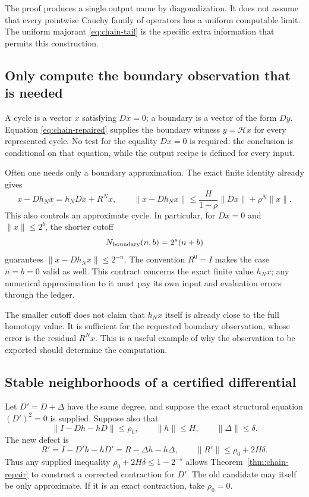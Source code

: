 The proof produces a single output name by diagonalization.  It does not
assume that every pointwise Cauchy family of operators has a uniform
computable limit.  The uniform majorant \eqref{eq:chain-tail} is the
specific extra information that permits this construction.

\subsection{Only compute the boundary observation that is needed}

A cycle is a vector $x$ satisfying $Dx=0$; a boundary is a vector of
the form $Dy$.  Equation \eqref{eq:chain-repaired} supplies the boundary
witness $y=\mathcal Hx$ for every represented cycle.  No test for the
equality $Dx=0$ is required: the conclusion is conditional on that
equation, while the output recipe is defined for every input.

Often one needs only a boundary approximation.  The exact finite identity
already gives
\begin{equation}
 x-Dh_Nx=h_NDx+R^Nx,
 \qquad
 \|x-Dh_Nx\|
 \le\frac{H}{1-\rho}\|Dx\|+\rho^N\|x\|.
 \label{eq:approximate-cycle}
\end{equation}
This also controls an approximate cycle.  In particular, for $Dx=0$ and
$\|x\|\le2^b$, the shorter cutoff
\begin{equation}
                 N_{\rm boundary}(n,b)=2^s(n+b)
                 \label{eq:boundary-cutoff}
\end{equation}
guarantees $\|x-Dh_Nx\|\le2^{-n}$.  The convention $R^0=I$ makes
the case $n=b=0$ valid as well.  This contract concerns the exact finite
value $h_Nx$; any numerical approximation to it must pay its own input
and evaluation errors through the ledger.

The smaller cutoff does not claim that $h_Nx$ itself is already close to
the full homotopy value.  It is sufficient for the requested boundary
observation, whose error is the residual $R^Nx$.  This is a useful example
of why the observation to be exported should determine the computation.

\subsection{Stable neighborhoods of a certified differential}

Let $D'=D+\Delta$ have the same degree, and suppose the exact structural
equation $(D')^2=0$ is supplied.  Suppose also that
\[
           \|I-Dh-hD\|\le\rho_0,\qquad
           \|h\|\le H,\qquad \|\Delta\|\le\delta.
\]
The new defect is
\begin{equation}
 R'=I-D'h-hD'=R-\Delta h-h\Delta,
 \qquad \|R'\|\le\rho_0+2H\delta.
 \label{eq:chain-perturbation}
\end{equation}
Thus any supplied inequality
$\rho_0+2H\delta\le1-2^{-s}$ allows
Theorem~\ref{thm:chain-repair} to construct a corrected contraction
for $D'$.  The old candidate may itself be only approximate.  If it is
an exact contraction, take $\rho_0=0$.

